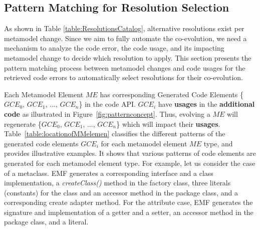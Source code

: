 


\subsection{Pattern Matching for Resolution Selection}
\label{pattern_matching}




As shown in Table \ref{table:ResolutionsCatalog}, alternative resolutions exist per metamodel change. Since we aim to fully automate the co-evolution, we need a mechanism to analyze the code error, the code usage, and its impacting metamodel change to decide which resolution to apply. 
This section presents the pattern matching process between metamodel changes and code usages for the retrieved code errors to automatically select resolutions for their co-evolution.

Each Metamodel Element $ME$ has corresponding Generated Code Elements \{$GCE_0$, $GCE_1$, ..., $GCE_n$\} in the code API. 
$GCE_i$ have \textbf{usages} in the \textbf{additional code} as illustrated in Figure~\ref{fig:patternconcept}.
Thus, evolving a $ME$ will regenerate \{$GCE_0$, $GCE_1$, ..., $GCE_n$\} which will impact their \textbf{usages}. 
%
Table~\ref{table:locationofMMelemen} classifies the different patterns of the generated code elements $GCE_i$ for each metamodel element $ME$ type, and provides illustrative examples. It shows that various patterns of code elements are generated for each metamodel element type. %
For example, let us consider the case of a metaclass. EMF generates a corresponding interface and a class implementation, a \emph{createClass()} method in the factory class, three literals (\ie constants) for the class and an accessor method in the package class, and a corresponding create adapter method. For the attribute case, EMF generates the signature and implementation of a getter and a setter, an accessor method in the package class, and a literal. 

